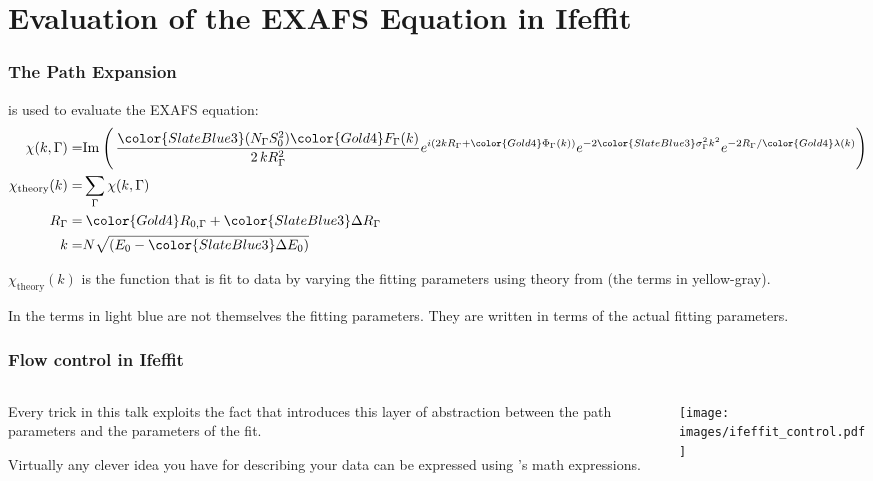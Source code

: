 \documentclass[10pt, xcolor=x11names, compress]{beamer}
\newcommand{\TheBigLesson}{%
  \begin{alertblock}{}
    In {\ifeffit} the {\color{SlateBlue3}terms in light blue} are not
    themselves the fitting parameters.  They are \alert{written in
      terms of} the actual fitting parameters.
  \end{alertblock}
}
\begin{document}
\section[Ifeffit]{Evaluation of the EXAFS Equation in Ifeffit}
\begin{frame}
  \frametitle{The Path Expansion}

  {\ifeffit} is used to evaluate the EXAFS equation:
  {\small
    \begin{align}
      \chi(k,\Gamma) =& {\Im}\>\Biggl(\, %
      { \frac{{\color{SlateBlue3}(N_\Gamma S_0^2)}{\color{Gold4}F_\Gamma(k)}}
        {2\,kR_\Gamma^2} }
      e^{i(2kR_\Gamma + {\color{Gold4}\Phi_\Gamma(k)})}
      e^{-2{\color{SlateBlue3}\sigma_\Gamma^2}k^2}
      e^{-2R_\Gamma/{\color{Gold4}\lambda(k)}}
      \Biggl) \\
      \chi_{\mathrm{theory}}(k) =& \sum\limits_{\Gamma}\chi(k,\Gamma) \notag\\
      R_\Gamma =& \> {\color{Gold4}R_{0,\Gamma}} +
      {\color{SlateBlue3}\Delta R_\Gamma} \\
      k =& N\sqrt{(E_0 - {\color{SlateBlue3}\Delta E_0})}
    \end{align}}

  \medskip

  $\chi_{\mathrm{theory}}(k)$ is the function that is fit to data by
  varying the fitting parameters using theory from {\feff} (the
  {\color{Gold4}terms in yellow-gray}).

  \bigskip

  \TheBigLesson
\end{frame}

\begin{frame}
  \frametitle{Flow control in Ifeffit}

  \begin{columns}
    \begin{column}{0.5\linewidth}
      Every trick in this talk exploits the fact that {\ifeffit}
      introduces this layer of abstraction between the
      {\color{SlateBlue3}path parameters} and the
      {\color{Green4}parameters of the fit}.

      \bigskip

      \begin{exampleblock}{}
        Virtually any clever idea you have for describing your data
        can be expressed using {\ifeffit}'s math expressions.
      \end{exampleblock}
    \end{column}
    \begin{column}{0.5\linewidth}
      \texttt{[image: images/ifeffit\_control.pdf]}      
    \end{column}
  \end{columns}
\end{frame}
\end{document}

